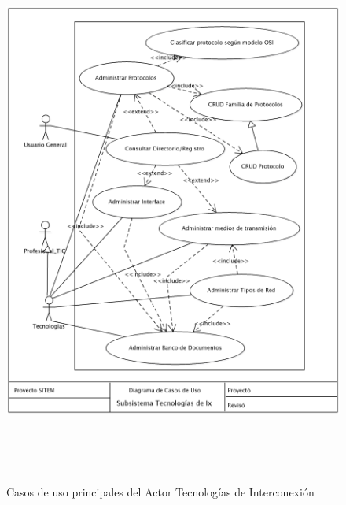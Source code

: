 \begin{figure}
 \centering
 \includegraphics[width=156mm, height=182mm]{casos_tecnologias.png}
 \caption{Casos de uso principales del Actor Tecnologías de Interconexión}
 \label{casos_tecnologia}
\end{figure}

